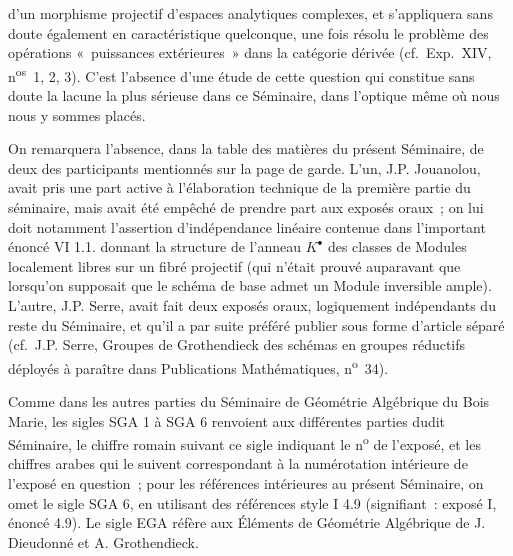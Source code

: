 d'un morphisme projectif d'espaces analytiques complexes, et s'appliquera sans doute également en caractéristique quelconque, une fois résolu le problème des opérations «~puissances extérieures~» dans la catégorie dérivée (cf.\ Exp.\ XIV, n\textsuperscript{os}~1, 2, 3). C'est l'absence d'une étude de cette question qui constitue sans doute la lacune la plus sérieuse dans ce Séminaire, dans l'optique même où nous nous y sommes placés.

On remarquera l'absence, dans la table des matières du présent Séminaire, de deux des participants mentionnés sur la page de garde. L'un, J.P. Jouanolou, avait pris une part active à l'élaboration technique de la première partie du séminaire, mais avait été empêché de prendre part aux exposés oraux~; on lui doit notamment l'assertion d'indépendance linéaire contenue dans l'important énoncé VI 1.1. donnant la structure de l'anneau $K^{\bullet}$ des classes de Modules localement libres sur un fibré projectif (qui n'était prouvé auparavant que lorsqu'on supposait que le schéma de base admet un Module inversible ample). L'autre, J.P. Serre, avait fait deux exposés oraux, logiquement indépendants du reste du Séminaire, et qu'il a par suite préféré publier sous forme d'article séparé (cf.\ J.P. Serre, Groupes de Grothendieck des schémas en groupes réductifs déployés à paraître dans Publications Mathématiques, n\textsuperscript{o}~34).

Comme dans les autres parties du Séminaire de Géométrie Algébrique du Bois Marie, les sigles SGA 1 à SGA 6 renvoient aux différentes parties dudit Séminaire, le chiffre romain suivant ce sigle indiquant le n\textsuperscript{o} de l'exposé, et les chiffres arabes qui le suivent correspondant à la numérotation intérieure de l'exposé en question~; pour les références intérieures au présent Séminaire, on omet le sigle SGA 6, en utilisant des références style I 4.9 (signifiant~: exposé I, énoncé 4.9). Le sigle EGA réfère aux Éléments de Géométrie Algébrique de J. Dieudonné et A. Grothendieck.

